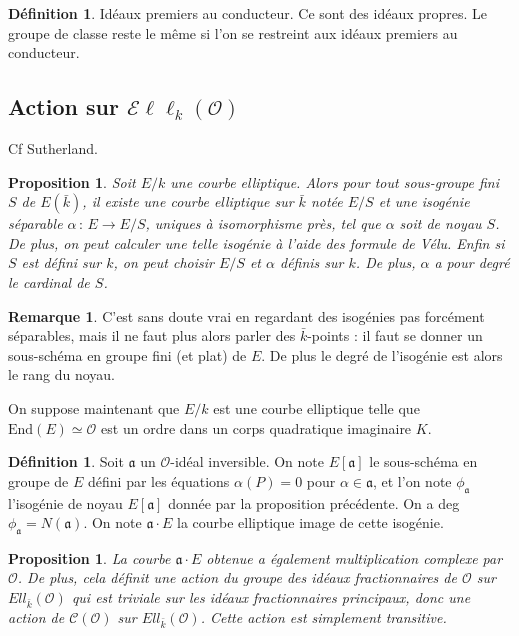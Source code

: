 \documentclass[11pt,a4paper]{article}
\renewcommand{\O}{\mathcal{O}}
\newcommand{\Cl}{\mathcal{C}}
\newcommand{\vers}{\rightarrow}
\newcommand{\End}{\mathrm{End}}
\newcommand{\Ell}{\mathcal{E}\ell\ell}
\renewcommand{\frak}{\mathfrak}
\newcommand{\de}{\,:\,}
\newtheorem{prop}[thm]{Proposition}
\theoremstyle{definition}
\newtheorem*{rem}{Remarque}
\newtheorem{defi}[thm]{Définition}
\begin{document}
\begin{defi}
Idéaux premiers au conducteur. Ce sont des idéaux propres. Le groupe de classe reste le même si l'on se restreint aux idéaux premiers au conducteur.
\end{defi}

\subsection{Action sur $\Ell_k(\O)$}

Cf Sutherland.

\begin{prop}
Soit $E/k$ une courbe elliptique. Alors pour tout sous-groupe fini $S$ de $E(\bar{k})$, il existe une courbe elliptique sur $\bar{k}$ notée $E/S$ et une isogénie séparable $\alpha\de E \vers E/S$, uniques à isomorphisme près, tel que $\alpha$ soit de noyau $S$. De plus, on peut calculer une telle isogénie à l'aide des formule de Vélu. Enfin si $S$ est défini sur $k$, on peut choisir $E/S$ et $\alpha$ définis sur $k$. De plus, $\alpha$ a pour degré le cardinal de $S$.
\end{prop}

\begin{rem}
C'est sans doute vrai en regardant des isogénies pas forcément séparables, mais il ne faut plus alors parler des $\bar{k}$-points : il faut se donner un sous-schéma en groupe fini (et plat) de $E$. De plus le degré de l'isogénie est alors le rang du noyau.
\end{rem}

On suppose maintenant que $E/k$ est une courbe elliptique telle que $\End(E)\simeq \O$ est un ordre dans un corps quadratique imaginaire $K$.

\begin{defi}
Soit $\frak a$ un $\O$-idéal inversible. On note $E[\frak a]$ le sous-schéma en groupe de $E$ défini par les équations $\alpha(P)=0$ pour $\alpha\in\frak a$, et l'on note $\phi_{\frak a}$ l'isogénie de noyau $E[\frak a]$ donnée par la proposition précédente. On a deg $\phi_{\frak a}=N(\frak a)$. On note $\frak{a}\cdot E$ la courbe elliptique image de cette isogénie.
\end{defi}

\begin{prop}
La courbe $\frak{a}\cdot E$ obtenue a également multiplication complexe par $\O$. De plus, cela définit une action du groupe des idéaux fractionnaires de $\O$ sur $Ell_{\bar{k}}(\O)$ qui est triviale sur les idéaux fractionnaires principaux, donc une action de $\Cl(\O)$ sur $Ell_{\bar{k}}(\O)$. Cette action est simplement transitive.
\end{prop}
\end{document}
